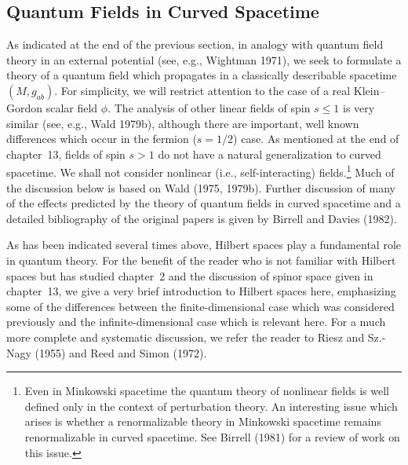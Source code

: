 
\subsection{Quantum Fields in Curved Spacetime}\label{sec:14.2}

As indicated at the end of the previous section, in analogy with quantum field
theory in an external potential (see, e.g., Wightman 1971), we seek to formulate a
theory of a quantum field which propagates in a classically describable spacetime
\((M,g_{ab})\). For simplicity, we will restrict attention to the case of a real
Klein--Gordon scalar field \(\phi\). The analysis of other linear fields of spin
\(s\leq 1\) is very similar (see, e.g., Wald 1979b), although there are important,
well known differences which occur in the fermion (\(s=1/2\)) case. As mentioned
at the end of chapter~13, fields of spin \(s>1\) do not have a natural generalization
to curved spacetime. We shall not consider nonlinear (i.e., self-interacting)
fields.\footnote{Even in Minkowski spacetime the quantum theory of nonlinear fields
is well defined only in the context of perturbation theory. An interesting issue which
arises is whether a renormalizable theory in Minkowski spacetime remains
renormalizable in curved spacetime. See Birrell (1981) for a review of work on this
issue.} Much of the discussion below is based on Wald (1975, 1979b). Further
discussion of many of the effects predicted by the theory of quantum fields in curved
spacetime and a detailed bibliography of the original papers is given by Birrell and
Davies (1982).

As has been indicated several times above, Hilbert spaces play a fundamental role in
quantum theory. For the benefit of the reader who is not familiar with Hilbert spaces
but has studied chapter~2 and the discussion of spinor space given in chapter~13, we
give a very brief introduction to Hilbert spaces here, emphasizing some of the
differences between the finite-dimensional case which was considered previously and
the infinite-dimensional case which is relevant here. For a much more complete and
systematic discussion, we refer the reader to Riesz and Sz.-Nagy (1955) and Reed and
Simon (1972).

